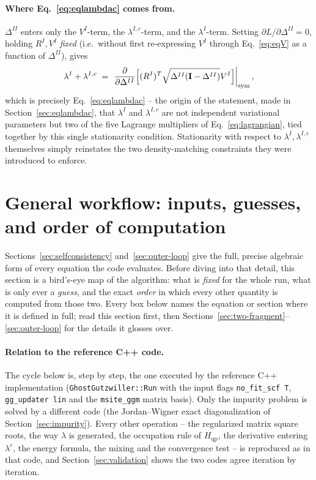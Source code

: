 \documentclass[11pt]{article}
\newcommand{\Hqp}{H_{\mathrm{qp}}}
\begin{document}
\paragraph{Where Eq.~\eqref{eq:eqlambdac} comes from.} $\Delta^{II}$ enters
only the $V^I$-term, the $\lambda^{I,c}$-term, and the $\lambda^I$-term.
Setting $\partial L/\partial\Delta^{II}=0$, holding $R^I,V^I$ \emph{fixed}
(i.e.\ without first re-expressing $V^I$ through Eq.~\eqref{eq:eqV} as a
function of $\Delta^{II}$), gives
\begin{equation}
  \lambda^I + \lambda^{I,c} \;=\; \left.\frac{\partial}{\partial\Delta^{II}}
     \Bigl[(R^I)^T\sqrt{\Delta^{II}(\mathbf{I}-\Delta^{II})}V^I\Bigr]\right|_{\mathrm{sym}},
\end{equation}
which is precisely Eq.~\eqref{eq:eqlambdac} -- the origin of the statement,
made in Section~\ref{sec:eqlambdac}, that $\lambda^I$ and $\lambda^{I,c}$ are
not independent variational parameters but two of the five Lagrange
multipliers of Eq.~\eqref{eq:lagrangian}, tied together by this single
stationarity condition. Stationarity with respect to $\lambda^I,\lambda^{I,c}$
themselves simply reinstates the two density-matching constraints they were
introduced to enforce.

\section{General workflow: inputs, guesses, and order of computation}
\label{sec:workflow}

Sections~\ref{sec:selfconsistency} and~\ref{sec:outer-loop} give the full,
precise algebraic form of every equation the code evaluates. Before diving
into that detail, this section is a bird's-eye map of the algorithm: what is
\emph{fixed} for the whole run, what is only ever a \emph{guess}, and the
exact \emph{order} in which every other quantity is computed from those two.
Every box below names the equation or section where it is defined in full;
read this section first, then Sections~\ref{sec:two-fragment}--\ref{sec:outer-loop}
for the details it glosses over.

\paragraph{Relation to the reference C++ code.} The cycle below is, step by
step, the one executed by the reference C++ implementation
(\texttt{GhostGutzwiller::Run} with the input flags \texttt{no\_fit\_scf T},
\texttt{gg\_updater lin} and the \texttt{msite\_ggm} matrix basis). Only the
impurity problem is solved by a different code (the Jordan--Wigner
exact diagonalization of Section~\ref{sec:impurity}). Every other operation
-- the regularized matrix square roots, the way $\lambda$ is generated, the
occupation rule of $\Hqp$, the derivative entering $\lambda^c$, the energy
formula, the mixing and the convergence test -- is reproduced as in that
code, and Section~\ref{sec:validation} shows the two codes agree iteration by
iteration.
\end{document}
